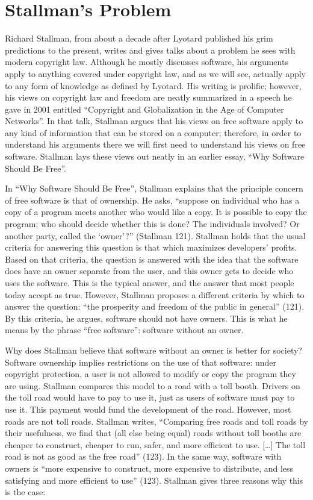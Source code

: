 \documentclass[titlepage]{article}
\begin{document}
\section{Stallman's Problem}\label{stallmans-problem}

Richard Stallman, from about a decade after Lyotard published his grim
predictions to the present, writes and gives talks about a problem he
sees with modern copyright law. Although he mostly discusses software,
his arguments apply to anything covered under copyright law, and as we
will see, actually apply to any form of knowledge as defined by Lyotard.
His writing is prolific; however, his views on copyright law and freedom
are neatly summarized in a speech he gave in 2001 entitled ``Copyright
and Globalization in the Age of Computer Networks''. In that talk,
Stallman argues that his views on free software apply to any kind of
information that can be stored on a computer; therefore, in order to
understand his arguments there we will first need to understand his
views on free software. Stallman lays these views out neatly in an
earlier essay, ``Why Software Should Be Free''.

In ``Why Software Should Be Free'', Stallman explains that the principle
concern of free software is that of ownership. He asks, ``suppose on
individual who has a copy of a program meets another who would like a
copy. It is possible to copy the program; who should decide whether this
is done? The individuals involved? Or another party, called the
`owner'?'' (Stallman 121). Stallman holds that the usual criteria for
answering this question is that which maximizes developers' profits.
Based on that criteria, the question is answered with the idea that the
software does have an owner separate from the user, and this owner gets
to decide who uses the software. This is the typical answer, and the
answer that most people today accept as true. However, Stallman proposes
a different criteria by which to answer the question: ``the prosperity
and freedom of the public in general'' (121). By this criteria, he
argues, software should not have owners. This is what he means by the
phrase ``free software'': software without an owner.

Why does Stallman believe that software without an owner is better for
society? Software ownership implies restrictions on the use of that
software: under copyright protection, a user is not allowed to modify or
copy the program they are using. Stallman compares this model to a road
with a toll booth. Drivers on the toll road would have to pay to use it,
just as users of software must pay to use it. This payment would fund
the development of the road. However, most roads are not toll roads.
Stallman writes, ``Comparing free roads and toll roads by their
usefulness, we find that (all else being equal) roads without toll
booths are cheaper to construct, cheaper to run, safer, and more
efficient to use. {[}\ldots{}{]} The toll road is not as good as the
free road'' (123). In the same way, software with owners is ``more
expensive to construct, more expensive to distribute, and less
satisfying and more efficient to use'' (123). Stallman gives three
reasons why this is the case:
\end{document}
